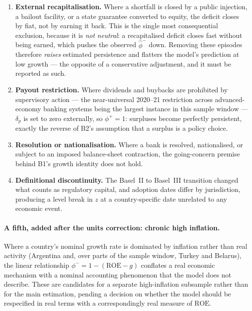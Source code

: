 \documentclass[11pt]{article}
\begin{document}
\begin{enumerate}
\item \textbf{External recapitalisation.} Where a shortfall is closed by a
  public injection, a bailout facility, or a state guarantee converted to
  equity, the deficit closes by fiat, not by earning it back. This is the
  single most consequential exclusion, because it is \emph{not neutral}: a
  recapitalised deficit closes fast without being earned, which pushes the
  observed $\hat\phi^-$ down. Removing these episodes therefore
  \emph{raises} estimated persistence and flatters the model's prediction
  at low growth --- the opposite of a conservative adjustment, and it must
  be reported as such.

\item \textbf{Payout restriction.} Where dividends and buybacks are
  prohibited by supervisory action --- the near-universal 2020--21
  restriction across advanced-economy banking systems being the largest
  instance in this sample window --- $\delta_p$ is set to zero externally,
  so $\phi^+ = 1$: surpluses become perfectly persistent, exactly the
  reverse of B2's assumption that a surplus is a policy choice.

\item \textbf{Resolution or nationalisation.} Where a bank is resolved,
  nationalised, or subject to an imposed balance-sheet contraction, the
  going-concern premise behind B1's growth identity does not hold.

\item \textbf{Definitional discontinuity.} The Basel~II to Basel~III
  transition changed what counts as regulatory capital, and adoption dates
  differ by jurisdiction, producing a level break in $z$ at a
  country-specific date unrelated to any economic event.

\end{enumerate}

\paragraph{A fifth, added after the units correction: chronic high
inflation.} Where a country's nominal growth rate is dominated by
inflation rather than real activity (Argentina and, over parts of the
sample window, Turkey and Belarus), the linear relationship
$\phi^- = 1-(\mathrm{ROE}-g)$ conflates a real economic mechanism with a
nominal accounting phenomenon that the model does not describe. These are
candidates for a separate high-inflation subsample rather than for the
main estimation, pending a decision on whether the model should be
respecified in real terms with a correspondingly real measure of
$\mathrm{ROE}$.
\end{document}

